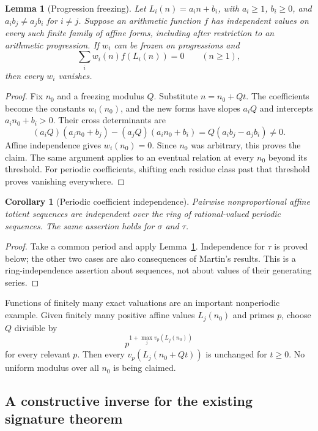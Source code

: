 \documentclass[11pt,a4paper]{article}
\newtheorem{lemma}[theorem]{Lemma}
\newtheorem{corollary}[theorem]{Corollary}
\theoremstyle{definition}\newtheorem{definition}[theorem]{Definition}
\theoremstyle{remark}\newtheorem*{remark}{Remark}
\begin{document}
\begin{lemma}[Progression freezing]\label{lem:freeze}
Let $L_i(n)=a_i n+b_i$, with $a_i\ge1$, $b_i\ge0$, and
$a_i b_j\ne a_j b_i$ for $i\ne j$. Suppose an arithmetic function $f$ has
independent values on every such finite family of affine forms, including
after restriction to an arithmetic progression. If $w_i$ can be frozen on
progressions and
\[
 \sum_i w_i(n)f(L_i(n))=0\qquad(n\ge1),
\]
then every $w_i$ vanishes.
\end{lemma}
\begin{proof}
Fix $n_0$ and a freezing modulus $Q$. Substitute $n=n_0+Qt$.
The coefficients become the constants $w_i(n_0)$, and the new forms have slopes
$a_iQ$ and intercepts $a_i n_0+b_i>0$. Their cross determinants are
\[
 (a_iQ)(a_jn_0+b_j)-(a_jQ)(a_in_0+b_i)
 =Q(a_i b_j-a_j b_i)\ne0.
\]
Affine independence gives $w_i(n_0)=0$. Since $n_0$ was arbitrary, this proves
the claim. The same argument applies to an eventual relation at every $n_0$
beyond its threshold. For periodic coefficients, shifting each residue class
past that threshold proves vanishing everywhere.
\end{proof}

\begin{corollary}[Periodic coefficient independence]\label{cor:periodic}
Pairwise nonproportional affine totient sequences are independent over the
ring of rational-valued periodic sequences. The same assertion holds for
$\sigma$ and $\tau$.
\end{corollary}
\begin{proof}
Take a common period and apply Lemma~\ref{lem:freeze}. Independence for $\tau$
is proved below; the other two cases are also consequences of Martin's
results. This is a ring-independence assertion about sequences, not about
values of their generating series.
\end{proof}

Functions of finitely many exact valuations are an important nonperiodic
example. Given finitely many positive affine values $L_j(n_0)$ and primes $p$,
choose $Q$ divisible by
\[
 p^{1+\max_j v_p(L_j(n_0))}
\]
for every relevant $p$. Then every $v_p(L_j(n_0+Qt))$ is unchanged for $t\ge0$.
No uniform modulus over all $n_0$ is being claimed.

\subsection{A constructive inverse for the existing signature theorem}
\end{document}
